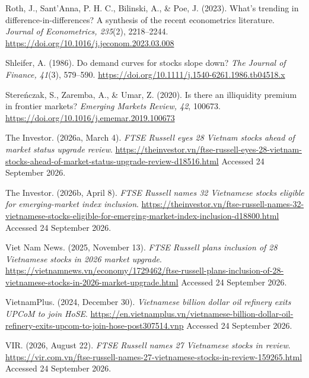 \documentclass[review,authoryear,12pt]{elsarticle}
\begin{document}
Roth, J., Sant'Anna, P. H. C., Bilinski, A., \& Poe, J. (2023). What's
trending in difference-in-differences? A synthesis of the recent
econometrics literature. \emph{Journal of Econometrics, 235}(2),
2218--2244. \url{https://doi.org/10.1016/j.jeconom.2023.03.008}

Shleifer, A. (1986). Do demand curves for stocks slope down? \emph{The
Journal of Finance, 41}(3), 579--590.
\url{https://doi.org/10.1111/j.1540-6261.1986.tb04518.x}

Stereńczak, S., Zaremba, A., \& Umar, Z. (2020). Is there an illiquidity
premium in frontier markets? \emph{Emerging Markets Review, 42}, 100673.
\url{https://doi.org/10.1016/j.ememar.2019.100673}

The Investor. (2026a, March 4). \emph{FTSE Russell eyes 28 Vietnam
stocks ahead of market status upgrade review}.
\url{https://theinvestor.vn/ftse-russell-eyes-28-vietnam-stocks-ahead-of-market-status-upgrade-review-d18516.html}
Accessed 24 September 2026.

The Investor. (2026b, April 8). \emph{FTSE Russell names 32 Vietnamese
stocks eligible for emerging-market index inclusion}.
\url{https://theinvestor.vn/ftse-russell-names-32-vietnamese-stocks-eligible-for-emerging-market-index-inclusion-d18800.html}
Accessed 24 September 2026.

Viet Nam News. (2025, November 13). \emph{FTSE Russell plans inclusion
of 28 Vietnamese stocks in 2026 market upgrade}.
\url{https://vietnamnews.vn/economy/1729462/ftse-russell-plans-inclusion-of-28-vietnamese-stocks-in-2026-market-upgrade.html}
Accessed 24 September 2026.

VietnamPlus. (2024, December 30). \emph{Vietnamese billion dollar oil
refinery exits UPCoM to join HoSE}.
\url{https://en.vietnamplus.vn/vietnamese-billion-dollar-oil-refinery-exits-upcom-to-join-hose-post307514.vnp}
Accessed 24 September 2026.

VIR. (2026, August 22). \emph{FTSE Russell names 27 Vietnamese stocks in
review}.
\url{https://vir.com.vn/ftse-russell-names-27-vietnamese-stocks-in-review-159265.html}
Accessed 24 September 2026.
\end{document}
